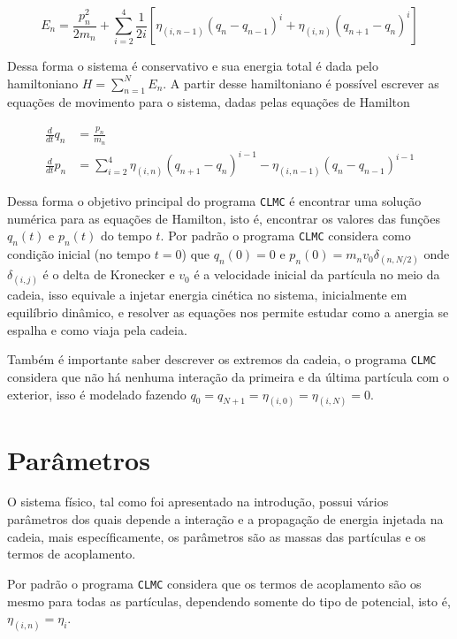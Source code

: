 \documentclass[
   article,                      %
   10pt,                         %
   openright,                    %
   oneside,                      %
   a4paper,                      %
   sumario = tradicional,        %
	chapter=TITLE,		%
	section=TITLE,		%
	subsection=TITLE,	%
	subsubsection=TITLE,%
   english,                      %
   french,                       %
   spanish,                      %
   brazil,                       %
   xcolor=table                  %
]{abntex2}
\begin{document}
\begin{equation}
E_n = \frac{p_n^2}{2 m_n}
   + \sum_{i = 2}^{4}
   \frac{1}{2i}\left[\eta_{(i, n-1)}(q_n - q_{n-1})^i + \eta_{(i, n)}(q_{n+1} - q_n)^i\right]
\end{equation}

Dessa forma o sistema é conservativo e sua energia total é dada pelo
hamiltoniano $H = \sum_{n=1}^N E_n$. A partir desse hamiltoniano é
possível escrever as equações de movimento para o sistema, dadas pelas
equações de Hamilton

\begin{align}
\frac{d}{dt} q_n &= \frac{p_n}{m_n}\\
\frac{d}{dt} p_n &=
   \sum_{i = 2}^{4}
   \eta_{(i, n)}(q_{n+1} - q_n)^{i-1} - \eta_{(i, n-1)}(q_n - q_{n-1})^{i-1}
\end{align}

Dessa forma o objetivo principal do programa \texttt{CLMC} é encontrar uma
solução numérica para as equações de Hamilton, isto é, encontrar
os valores das funções $q_n(t)$ e $p_n(t)$ do tempo $t$.
Por padrão o programa
\texttt{CLMC}
considera como condição inicial (no tempo $t=0$) que $q_n(0) = 0$
e $p_n(0) = m_n v_0 \delta_{(n, N/2)}$
onde $\delta_{(i, j)}$ é o delta de Kronecker
e $v_0$ é a velocidade inicial da partícula no meio da cadeia,
isso equivale a injetar energia cinética no sistema, inicialmente em equilíbrio
dinâmico, e resolver as equações nos permite estudar como a anergia se espalha
e como viaja pela cadeia.

Também é importante saber descrever os extremos da cadeia, o programa
\texttt{CLMC} considera que não há nenhuma interação da primeira e da
última partícula com o exterior, isso é modelado fazendo
$q_0 = q_{N+1} = \eta_{(i, 0)} = \eta_{(i, N)} = 0$.

\section{Parâmetros}

O sistema físico, tal como foi apresentado na introdução, possui vários
parâmetros dos quais depende a interação e a propagação de energia injetada na
cadeia, mais específicamente, os parâmetros são as massas das partículas
e os termos de acoplamento.

Por padrão o programa
\texttt{CLMC}
considera que os termos de acoplamento são os mesmo para todas as partículas,
dependendo somente do tipo de potencial, isto é,
$\eta_{(i, n)} = \eta_i$.
\end{document}
